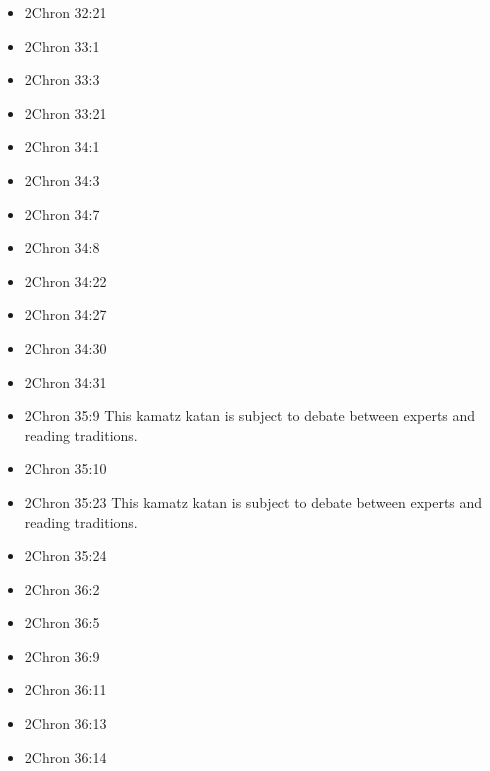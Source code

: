 \documentclass[14pt]{book}
\begin{document}
\begin{multicols}{2}
\begin{itemize}
				\item 2Chron 32:21
				
				\item 2Chron 33:1
				
				\item 2Chron 33:3
				
				\item 2Chron 33:21
				
				\item 2Chron 34:1
				
				\item 2Chron 34:3
				
				\item 2Chron 34:7
				
				\item 2Chron 34:8
				
				\item 2Chron 34:22
						
						\item 2Chron 34:27
						
						\item 2Chron 34:30
						
						\item 2Chron 34:31
						
						\item 2Chron 35:9 This kamatz katan is subject to debate between experts and reading traditions.
						
						\item 2Chron 35:10
						
						\item 2Chron 35:23 This kamatz katan is subject to debate between experts and reading traditions.
						
						\item 2Chron 35:24
						
						\item 2Chron 36:2
						
						\item 2Chron 36:5
						
						\item 2Chron 36:9
						
						\item 2Chron 36:11
						
						\item 2Chron 36:13
						
						\item 2Chron 36:14
	\end{itemize}\end{multicols}
\end{document}
